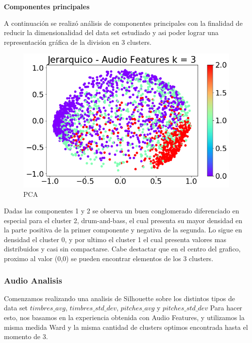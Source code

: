 \begin{center} \textbf{Componentes principales} \end{center}
A continuación se realizó análisis de componentes principales con la finalidad de reducir la dimensionalidad del data set estudiado y
asi poder lograr una representación gráfica de la division en 3 clusters.

\begin{figure}[H]
    \centering
    \includegraphics[width=\textwidth]{img/imagenes/jerarquico_AF/pca_3clusters.png}
    \caption{PCA}
    \label{fig:pca}
\end{figure}

Dadas las componentes 1 y 2 se observa un buen conglomerado diferenciado en especial para el cluster 2, drum-and-bass, el cual presenta su mayor densidad
en la parte positiva de la primer componente y negativa de la segunda. Lo sigue en densidad el cluster 0, y por ultimo el cluster 1 el cual presenta valores mas distribuidos y casi sin compactarse.
Cabe destactar que en el centro del grafico, proximo al valor (0,0) se pueden encontrar elementos de los 3 clusters.



\subsubsection{Audio Analisis}
Comenzamos realizando una analisis de Silhouette sobre los distintos tipos de data set $timbres\_avg$, $timbres\_std\_dev$, $pitches\_avg$ y $pitches\_std\_dev$
Para hacer esto, nos basamos en la experiencia obtenida con Audio Features, y utilizamos la misma medida Ward y la misma cantidad de clusters optimos encontrada hasta el momento de 3.

